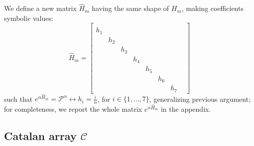 We define a new matrix $\hat{H}_{m}$ having the same shape of $H_{m}$, making
coefficients symbolic values:
\begin{displaymath}
\hat{H}_{m} = \left[\begin{matrix}  &   &   &   &   &   &   &  \\h_{1} &   &   &   &   &   &   &  \\  & h_{2} &   &   &   &   &   &  \\  &   & h_{3} &   &   &   &   &  \\  &   &   & h_{4} &   &   &   &  \\  &   &   &   & h_{5} &   &   &  \\  &   &   &   &   & h_{6} &   &  \\  &   &   &   &   &   & h_{7} &  \end{matrix}\right]
\end{displaymath}
such that $e^{\alpha\hat{H}_{m}}=\mathcal{P}^{\alpha} \leftrightarrow h_{i}=\frac{i}{\alpha}$, 
for $i\in \lbrace 1,\ldots,7 \rbrace$, generalizing previous argument; 
for completeness, we report the whole matrix $e^{\alpha\hat{H}_{m}}$ in the appendix.

\subsection{Catalan array $\mathcal{C}$}

